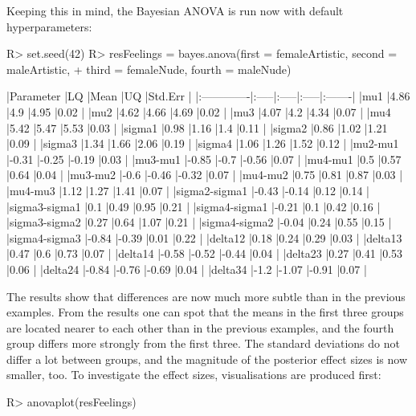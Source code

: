 Keeping this in mind, the Bayesian ANOVA is run now with default hyperparameters:
\begin{example}
R> set.seed(42)
R> resFeelings = bayes.anova(first = femaleArtistic, second = maleArtistic,
+   third = femaleNude, fourth = maleNude)

|Parameter     |LQ    |Mean  |UQ    |Std.Err |
|:-------------|:-----|:-----|:-----|:-------|
|mu1           |4.86  |4.9   |4.95  |0.02    |
|mu2           |4.62  |4.66  |4.69  |0.02    |
|mu3           |4.07  |4.2   |4.34  |0.07    |
|mu4           |5.42  |5.47  |5.53  |0.03    |
|sigma1        |0.98  |1.16  |1.4   |0.11    |
|sigma2        |0.86  |1.02  |1.21  |0.09    |
|sigma3        |1.34  |1.66  |2.06  |0.19    |
|sigma4        |1.06  |1.26  |1.52  |0.12    |
|mu2-mu1       |-0.31 |-0.25 |-0.19 |0.03    |
|mu3-mu1       |-0.85 |-0.7  |-0.56 |0.07    |
|mu4-mu1       |0.5   |0.57  |0.64  |0.04    |
|mu3-mu2       |-0.6  |-0.46 |-0.32 |0.07    |
|mu4-mu2       |0.75  |0.81  |0.87  |0.03    |
|mu4-mu3       |1.12  |1.27  |1.41  |0.07    |
|sigma2-sigma1 |-0.43 |-0.14 |0.12  |0.14    |
|sigma3-sigma1 |0.1   |0.49  |0.95  |0.21    |
|sigma4-sigma1 |-0.21 |0.1   |0.42  |0.16    |
|sigma3-sigma2 |0.27  |0.64  |1.07  |0.21    |
|sigma4-sigma2 |-0.04 |0.24  |0.55  |0.15    |
|sigma4-sigma3 |-0.84 |-0.39 |0.01  |0.22    |
|delta12       |0.18  |0.24  |0.29  |0.03    |
|delta13       |0.47  |0.6   |0.73  |0.07    |
|delta14       |-0.58 |-0.52 |-0.44 |0.04    |
|delta23       |0.27  |0.41  |0.53  |0.06    |
|delta24       |-0.84 |-0.76 |-0.69 |0.04    |
|delta34       |-1.2  |-1.07 |-0.91 |0.07    |
\end{example}
The results show that differences are now much more subtle than in the previous examples. From the results one can spot that the means in the first three groups are located nearer to each other than in the previous examples, and the fourth group differs more strongly from the first three. The standard deviations do not differ a lot between groups, and the magnitude of the posterior effect sizes is now smaller, too. To investigate the effect sizes, visualisations are produced first:
\begin{example}
R> anovaplot(resFeelings)
\end{example}
 
